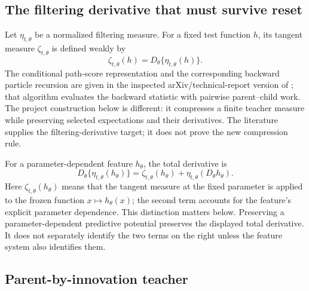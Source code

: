 \subsection{The filtering derivative that must survive reset}

Let \(\eta_{t,\theta}\) be a normalized filtering measure.  For a fixed test
function \(h\), its tangent measure \(\zeta_{t,\theta}\) is defined weakly by
\begin{equation}
\label{eq:bf-ledh-tangent-measure-definition}
  \zeta_{t,\theta}(h)
  =D_\theta\{\eta_{t,\theta}(h)\}.
\end{equation}
The conditional path-score representation and the corresponding backward
particle recursion are given in the inspected arXiv/technical-report version of
\citet[Section~2, Eq.~(2.5), and Algorithm~1]{delmoral2015uniform}; that
algorithm evaluates the backward statistic with pairwise parent--child work.
The project construction below is different: it compresses a finite teacher
measure while preserving selected expectations and their derivatives.  The
literature supplies the filtering-derivative target; it does not prove the new
compression rule.

For a parameter-dependent feature \(h_\theta\), the total derivative is
\begin{equation}
\label{eq:bf-ledh-parameter-dependent-feature-derivative}
  D_\theta\{\eta_{t,\theta}(h_\theta)\}
  =\zeta_{t,\theta}(h_\theta)
   +\eta_{t,\theta}(D_\theta h_\theta).
\end{equation}
Here \(\zeta_{t,\theta}(h_\theta)\) means that the tangent measure at the fixed
parameter is applied to the frozen function \(x\mapsto h_\theta(x)\); the second
term accounts for the feature's explicit parameter dependence.
This distinction matters below.  Preserving a parameter-dependent predictive
potential preserves the displayed total derivative.  It does not separately
identify the two terms on the right unless the feature system also identifies
them.

\subsection{Parent-by-innovation teacher}

